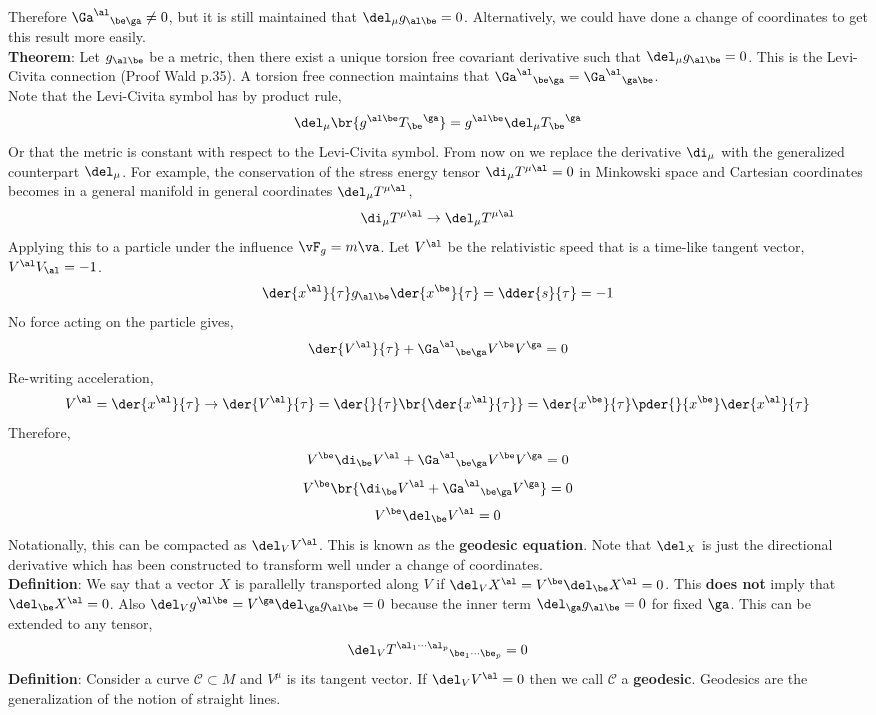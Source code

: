 \documentclass{article}
\begin{document}
Therefore ${\Ga^\al}_{\be\ga} \neq 0$, but it is still maintained that $\del_\mu g_{\al\be} = 0$. Alternatively, we could have done a change of coordinates to get this result more easily. \\

\textbf{Theorem}: Let $g_{\al\be}$ be a metric, then there exist a unique torsion free covariant derivative such that $\del_\mu g_{\al\be} = 0$. This is the Levi-Civita connection (Proof Wald p.35). A torsion free connection maintains that ${\Ga^\al}_{\be\ga} = {\Ga^\al}_{\ga\be}$. \\

Note that the Levi-Civita symbol has by product rule,
\[ \del_\mu \br{g^{\al\be}{T_{\be}}^\ga} = g^{\al\be} \del_\mu {T_\be}^\ga \]
Or that the metric is constant with respect to the Levi-Civita symbol. From now on we replace the derivative $\di_\mu$ with the generalized counterpart $\del_\mu$. For example, the conservation of the stress energy tensor $\di_\mu T^{\mu\al} = 0$ in Minkowski space and Cartesian coordinates becomes in a general manifold in general coordinates $\del_\mu T^{\mu\al}$,
\[ \di_\mu T^{\mu\al} \to \del_\mu T^{\mu\al} \]
Applying this to a particle under the influence $\vF_g = m \va$. Let $V^\al$ be the relativistic speed that is a time-like tangent vector, $V^\al V_\al = -1$.
\[ \der{x^\al}{\tau} g_{\al\be}\der{x^\be}{\tau} = \dder{s}{\tau} = -1 \]
No force acting on the particle gives,
\[ \der{V^\al}{\tau} + {\Ga^\al}_{\be\ga} V^\be V^\ga = 0 \]
Re-writing acceleration,
\[ V^\al = \der{x^\al}{\tau} \to \der{V^\al}{\tau} = \der{}{\tau}\br{\der{x^\al}{\tau}} = \der{x^\be}{\tau}\pder{}{x^\be} \der{x^\al}{\tau} \]
Therefore,
\[ V^\be \di_\be V^\al + {\Ga^\al}_{\be\ga} V^\be V^\ga = 0 \]
\[ V^\be \br{\di_\be V^\al + {\Ga^\al}_{\be\ga} V^\ga} = 0 \]
\[ V^\be \del_\be V^\al = 0 \]
Notationally, this can be compacted as $\del_V V^\al$. This is known as the \textbf{geodesic equation}. Note that $\del_X$ is just the directional derivative which has been constructed to transform well under a change of coordinates. \\

\textbf{Definition}: We say that a vector $X$ is parallelly transported along $V$ if $\del_V X^\al = V^\be \del_\be X^\al= 0$. This \textbf{does not} imply that $\del_\be X^\al = 0$. Also $\del_Vg^{\al\be} = V^\ga \del_\ga g_{\al\be} = 0$ because the inner term $\del_\ga g_{\al\be} = 0$ for fixed $\ga$. This can be extended to any tensor,
\[ \del_V {T^{\al_1 \cdots \al_p}}_{\be_1 \cdots \be_p} = 0 \]
\textbf{Definition}: Consider a curve $\mathcal{C} \subset M$ and $V^\mu$ is its tangent vector. If $\del_V V^\al = 0$ then we call $\mathcal{C}$ a \textbf{geodesic}. Geodesics are the generalization of the notion of straight lines.
\end{document}
